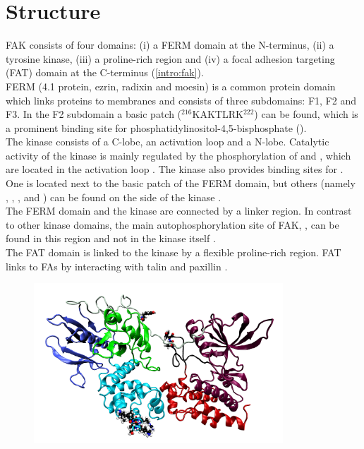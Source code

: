 \section{Structure}
FAK consists of four domains: (i) a FERM domain at the N-terminus, (ii) a tyrosine kinase, (iii) a proline-rich region and (iv) a focal adhesion targeting (FAT) domain at the C-terminus (\autoref{intro:fak}).\\
FERM (4.1 protein, ezrin, radixin and moesin) is a common protein domain which links proteins to membranes \autocite{fermdomain} and consists of three subdomains: F1, F2 and F3. In the F2 subdomain a basic patch ($^{216}$KAKTLRK$^{222}$) can be found, which is a prominent binding site for phosphatidylinositol-4,5-bisphosphate (\pip).\\
The kinase consists of a C-lobe, an activation loop and a N-lobe. Catalytic activity of the kinase is mainly regulated by the phosphorylation of  and , which are located in the activation loop \autocite{tyrosinePhosphor}. The kinase also provides binding sites for \pip{}. One is located next to the basic patch of the FERM domain, but others (namely , , ,  and ) can be found on the side of the kinase \autocites{pap002}{pap002Exp}.\\
The FERM domain and the kinase are connected by a linker region. In contrast to other kinase domains, the main autophosphorylation site of FAK, , can be found in this region and not in the kinase itself \autocite{pap001}.\\ %
The FAT domain is linked to the kinase by a flexible proline-rich region. FAT links to FAs by interacting with talin and paxillin \autocite{fatdomain}.
%
%
%
\begin{figure}
	\centering
	\includegraphics[height=6cm]{figures/introduction/fak}
	\label{intro:fak}
\end{figure}
%
%
%
